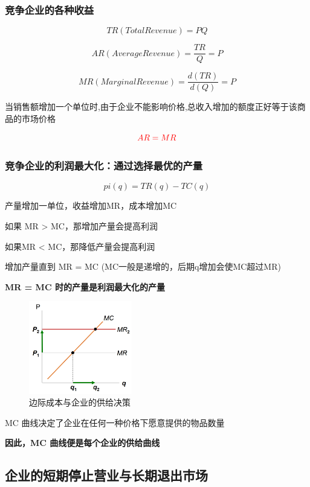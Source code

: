 \documentclass[12pt, a4paper]{article}
\begin{document}
\subsubsection{\textbf{竞争企业的各种收益}}

\[ TR (Total Revenue) = PQ \]

\[ AR (Average Revenue) = \frac{TR}{Q} = P \]

\[ MR (Marginal Revenue) = \frac{d(TR)}{d(Q)} = P\]

当销售额增加一个单位时,由于企业不能影响价格,总收入增加的额度正好等于该商品的市场价格

\[ \textcolor{red}{AR = MR} \]

\subsubsection{竞争企业的利润最大化：通过选择最优的产量}

\[pi(q) = TR(q) - TC(q)\]

产量增加一单位，收益增加MR，成本增加MC

如果 MR > MC，那增加产量会提高利润

如果MR < MC，那降低产量会提高利润

增加产量直到 MR = MC (MC一般是递增的，后期q增加会使MC超过MR)

\textbf{MR = MC 时的产量是利润最大化的产量}

\begin{figure}[H] 
  \centering %
  \includegraphics[width=0.4\textwidth]{完全竞争市场的企业利润最大化.png} 
  \caption{边际成本与企业的供给决策} %
\end{figure}

MC 曲线决定了企业在任何一种价格下愿意提供的物品数量

\textbf{因此，MC 曲线便是每个企业的供给曲线}



\subsection{企业的短期停止营业与长期退出市场}
\end{document}
